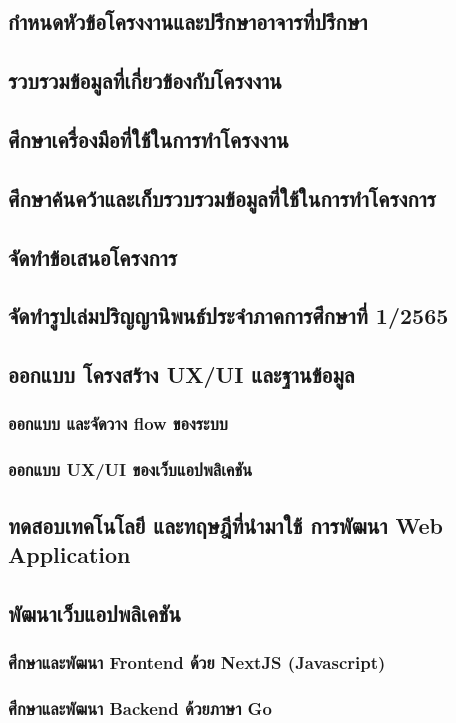 \documentclass[12pt,oneside,openright,a4paper]{cpe-thai-project}
\begin{document}
  \subsection{กำหนดหัวข้อโครงงานและปรึกษาอาจารที่ปรึกษา} 
  \subsection{รวบรวมข้อมูลที่เกี่ยวข้องกับโครงงาน}
  \subsection{ศึกษาเครื่องมือที่ใช้ในการทำโครงงาน}
  \subsection{ศึกษาค้นคว้าและเก็บรวบรวมข้อมูลที่ใช้ในการทำโครงการ}
  \subsection{จัดทำข้อเสนอโครงการ}
  \subsection{จัดทำรูปเล่มปริญญานิพนธ์ประจำภาคการศึกษาที่ 1/2565}
  \subsection{ออกแบบ โครงสร้าง UX/UI และฐานข้อมูล}
    \subsubsection{ออกแบบ และจัดวาง flow ของระบบ}
    \subsubsection{ออกแบบ UX/UI ของเว็บแอปพลิเคชัน}
  \subsection{ทดสอบเทคโนโลยี และทฤษฎีที่นำมาใช้ การพัฒนา Web  Application}
  \subsection{พัฒนาเว็บแอปพลิเคชัน}
    \subsubsection{ศึกษาและพัฒนา Frontend ด้วย NextJS (Javascript)}
    \subsubsection{ศึกษาและพัฒนา Backend ด้วยภาษา Go}
\end{document}

